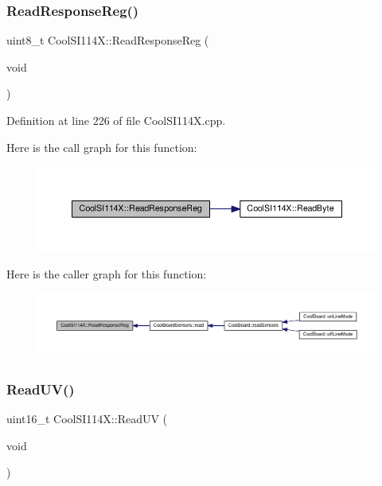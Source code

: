 \subsubsection{\texorpdfstring{Read\+Response\+Reg()}{ReadResponseReg()}}
{\footnotesize\ttfamily uint8\+\_\+t Cool\+S\+I114\+X\+::\+Read\+Response\+Reg (\begin{DoxyParamCaption}\item[{void}]{ }\end{DoxyParamCaption})}



Definition at line 226 of file Cool\+S\+I114\+X.\+cpp.

Here is the call graph for this function\+:\nopagebreak
\begin{figure}[H]
\begin{center}
\leavevmode
\includegraphics[width=350pt]{class_cool_s_i114_x_a869d3825147831d707f7ef324a665646_cgraph}
\end{center}
\end{figure}
Here is the caller graph for this function\+:\nopagebreak
\begin{figure}[H]
\begin{center}
\leavevmode
\includegraphics[width=350pt]{class_cool_s_i114_x_a869d3825147831d707f7ef324a665646_icgraph}
\end{center}
\end{figure}
\mbox{\label{class_cool_s_i114_x_a14ced664d74e93438440b0274109c111}} 
\subsubsection{\texorpdfstring{Read\+U\+V()}{ReadUV()}}
{\footnotesize\ttfamily uint16\+\_\+t Cool\+S\+I114\+X\+::\+Read\+UV (\begin{DoxyParamCaption}\item[{void}]{ }\end{DoxyParamCaption})}




